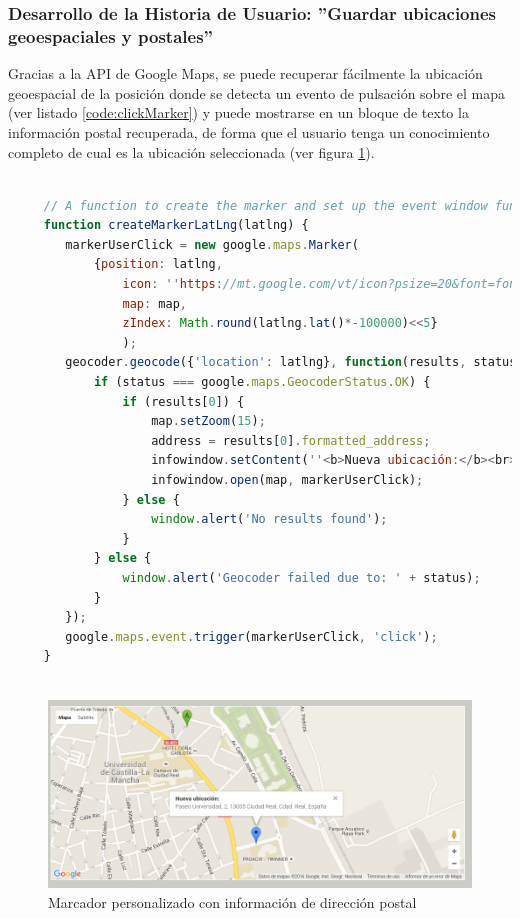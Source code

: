 	\subsubsection{Desarrollo de la Historia de Usuario: ''Guardar ubicaciones geoespaciales y postales''}
	
	Gracias a la API de Google Maps, se puede recuperar fácilmente la ubicación geoespacial de la posición donde se detecta un evento de pulsación sobre el mapa (ver listado \ref{code:clickMarker}) y puede mostrarse en un bloque de texto la información postal recuperada, de forma que el usuario tenga un conocimiento completo de cual es la ubicación seleccionada (ver figura \ref{fig:guardar_posiciones_1}).
	
	\begin{lstlisting}[language = JavaScript, frame = lines, caption  = {«Añadir marcador al mapa cuando el usuario pulsa con el ratón»}, label = code:clickMarker]
	
	 // A function to create the marker and set up the event window function 
	 function createMarkerLatLng(latlng) {
	 	markerUserClick = new google.maps.Marker(
	 		{position: latlng, 
	 			icon: ''https://mt.google.com/vt/icon?psize=20&font=fonts/Roboto-Regular.ttf&color=ff330000&name=icons/spotlight/spotlight-waypoint-blue.png'',
	 			map: map, 
	 			zIndex: Math.round(latlng.lat()*-100000)<<5}
	 			);
	 	geocoder.geocode({'location': latlng}, function(results, status) {
	 		if (status === google.maps.GeocoderStatus.OK) {
	 			if (results[0]) {
	 				map.setZoom(15);
	 				address = results[0].formatted_address;
	 				infowindow.setContent(''<b>Nueva ubicación:</b><br>'' + results[0].formatted_address);
	 				infowindow.open(map, markerUserClick);
	 			} else {
	 				window.alert('No results found');
	 			}
	 		} else {
	 			window.alert('Geocoder failed due to: ' + status);
	 		}
	 	});
	 	google.maps.event.trigger(markerUserClick, 'click');
	 }
	 
	 \end{lstlisting}

	\begin{figure}[H]
		\centering
		\includegraphics[width=15cm, fbox={\fboxrule} 4mm]{images/05-resultados/15-guardar_posiciones_1.png}
		\caption{Marcador personalizado con información de dirección postal}
		\label{fig:guardar_posiciones_1}
	\end{figure}
	 
